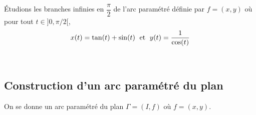 \documentclass[a4paper,10pt]{report}
\begin{document}
\begin{ex} Étudions les branches infinies en $\dfrac{\pi}{2}$ de l'arc paramétré définie par $f=(x,y)$ où pour tout $t \in ]0, \pi/2[$,
$$ x(t) = \tan(t)+\sin(t) \; \hbox{ et } \; y(t)=\dfrac{1}{\cos(t)}$$

\vspace{8cm}
\end{ex}

\newpage

$\phantom{test}$

\vspace{5cm}

\subsection{Construction d'un arc paramétré  du plan}
\noindent On se donne un arc paramétré du plan $\Gamma =(I,f)$ où $f=(x,y)$.
\end{document}
